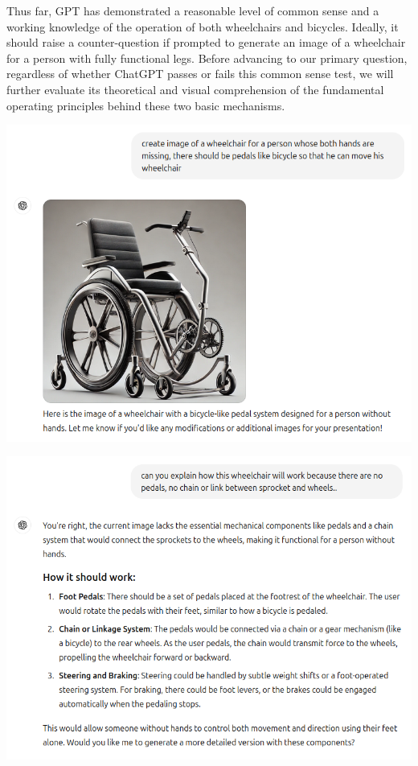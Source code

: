 \documentclass[11pt]{scrartcl}
\begin{document}
Thus far, GPT has demonstrated a reasonable level of common sense and a working knowledge of the operation of both wheelchairs and bicycles. Ideally, it should raise a counter-question if prompted to generate an image of a wheelchair for a person with fully functional legs. Before advancing to our primary question, regardless of whether ChatGPT passes or fails this common sense test, we will further evaluate its theoretical and visual comprehension of the fundamental operating principles behind these two basic mechanisms.

\begin{center}
\includegraphics[scale=0.39]{wheelchair_problem_1.png}
\end{center}

\begin{center}
\includegraphics[scale=0.39]{wheelchair_problem_2.png}
\end{center}
\end{document}
